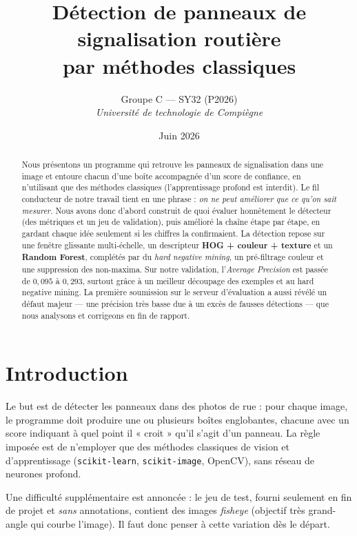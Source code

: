 \documentclass[a4paper,10pt]{article}
\title{\textbf{Détection de panneaux de signalisation routière\\par méthodes classiques}}
\author{Groupe C --- SY32 (P2026)\\
\textit{Université de technologie de Compiègne}}
\date{Juin 2026}
\begin{document}
\maketitle

\begin{abstract}
Nous présentons un programme qui retrouve les panneaux de signalisation dans une
image et entoure chacun d'une boîte accompagnée d'un score de confiance, en
n'utilisant que des méthodes classiques (l'apprentissage profond est interdit).
Le fil conducteur de notre travail tient en une phrase : \emph{on ne peut améliorer
que ce qu'on sait mesurer}. Nous avons donc d'abord construit de quoi évaluer
honnêtement le détecteur (des métriques et un jeu de validation), puis amélioré la
chaîne étape par étape, en gardant chaque idée seulement si les chiffres la
confirmaient. La détection repose sur une fenêtre glissante multi-échelle, un
descripteur \textbf{HOG + couleur + texture} et un \textbf{Random Forest}, complétés
par du \emph{hard negative mining}, un pré-filtrage couleur et une suppression des
non-maxima. Sur notre validation, l'\textit{Average Precision} est passée de
$0{,}095$ à $0{,}293$, surtout grâce à un meilleur découpage des exemples et au hard
negative mining. La première soumission sur le serveur d'évaluation a aussi révélé un
défaut majeur — une précision très basse due à un excès de fausses détections — que
nous analysons et corrigeons en fin de rapport.
\end{abstract}

\section{Introduction}
Le but est de détecter les panneaux dans des photos de rue : pour chaque image, le
programme doit produire une ou plusieurs boîtes englobantes, chacune avec un score
indiquant à quel point il « croit » qu'il s'agit d'un panneau. La règle imposée est
de n'employer que des méthodes classiques de vision et d'apprentissage
(\texttt{scikit-learn}, \texttt{scikit-image}, OpenCV), sans réseau de neurones
profond.

Une difficulté supplémentaire est annoncée : le jeu de test, fourni seulement en fin
de projet et \emph{sans} annotations, contient des images \emph{fisheye} (objectif
très grand-angle qui courbe l'image). Il faut donc penser à cette variation dès le
départ.
\end{document}

